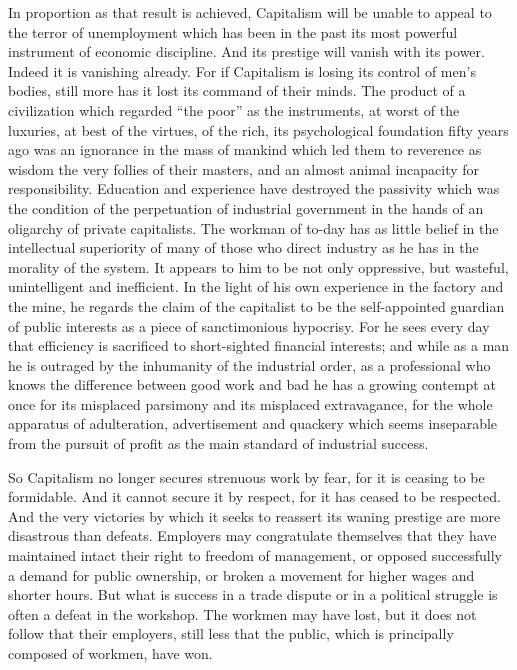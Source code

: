 \documentclass{book}
\begin{document}
In proportion as that result is achieved, Capitalism will be unable to appeal to the terror of unemployment which has been in the past its most powerful instrument of economic discipline. And its prestige will vanish with its power. Indeed it is vanishing already. For if Capitalism is losing its control of men’s bodies, still more has it lost its command of their minds. The product of a civilization which regarded “the poor” as the instruments, at worst of the luxuries, at best of the virtues, of the rich, its psychological foundation fifty years ago was an ignorance in the mass of mankind which led them to reverence as wisdom the very follies of their masters, and an almost animal incapacity for responsibility. Education and experience have destroyed the passivity which was the condition of the perpetuation of industrial government in the hands of an oligarchy of private capitalists. The workman of to-day has as little belief in the intellectual superiority of many of those who direct industry as he has in the morality of the system. It appears to him to be not only oppressive, but wasteful, unintelligent and inefficient. In the light of his own experience in the factory and the mine, he regards the claim of the capitalist to be the self-appointed guardian of public interests as a piece of sanctimonious hypocrisy. For he sees every day that efficiency is sacrificed to short-sighted financial interests; and while as a man he is outraged by the inhumanity of the industrial order, as a professional who knows the difference between good work and bad he has a growing contempt at once for its misplaced parsimony and its misplaced extravagance, for the whole apparatus of adulteration, advertisement and quackery which seems inseparable from the pursuit of profit as the main standard of industrial success.

So Capitalism no longer secures strenuous work by fear, for it is ceasing to be formidable. And it cannot secure it by respect, for it has ceased to be respected. And the very victories by which it seeks to reassert its waning prestige are more disastrous than defeats. Employers may congratulate themselves that they have maintained intact their right to freedom of management, or opposed successfully a demand for public ownership, or broken a movement for higher wages and shorter hours. But what is success in a trade dispute or in a political struggle is often a defeat in the workshop. The workmen may have lost, but it does not follow that their employers, still less that the public, which is principally composed of workmen, have won.
\end{document}
